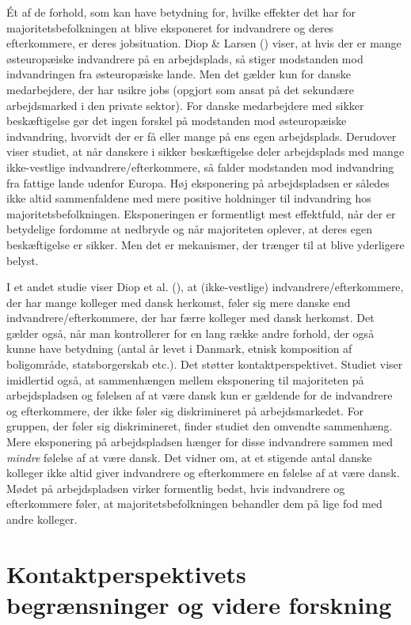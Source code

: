 \documentclass[
]{book}
\begin{document}
Ét af de forhold, som kan have betydning for, hvilke effekter det har for majoritetsbefolkningen at blive eksponeret for indvandrere og deres efterkommere, er deres jobsituation. Diop \& Larsen () viser, at hvis der er mange østeuropæiske indvandrere på en arbejdsplads, så stiger modstanden mod indvandringen fra østeuropæiske lande. Men det gælder kun for danske medarbejdere, der har usikre jobs (opgjort som ansat på det sekundære arbejdsmarked i den private sektor). For danske medarbejdere med sikker beskæftigelse gør det ingen forskel på modstanden mod østeuropæiske indvandring, hvorvidt der er få eller mange på ens egen arbejdsplads. Derudover viser studiet, at når danskere i sikker beskæftigelse deler arbejdsplads med mange ikke-vestlige indvandrere/efterkommere, så falder modstanden mod indvandring fra fattige lande udenfor Europa. Høj eksponering på arbejdspladsen er således ikke altid sammenfaldene med mere positive holdninger til indvandring hos majoritetsbefolkningen. Eksponeringen er formentligt mest effektfuld, når der er betydelige fordomme at nedbryde og når majoriteten oplever, at deres egen beskæftigelse er sikker. Men det er mekanismer, der trænger til at blive yderligere belyst.

I et andet studie viser Diop et al. (), at (ikke-vestlige) indvandrere/efterkommere, der har mange kolleger med dansk herkomst, føler sig mere danske end indvandrere/efterkommere, der har færre kolleger med dansk herkomst. Det gælder også, når man kontrollerer for en lang række andre forhold, der også kunne have betydning (antal år levet i Danmark, etnisk komposition af boligområde, statsborgerskab etc.). Det støtter kontaktperspektivet. Studiet viser imidlertid også, at sammenhængen mellem eksponering til majoriteten på arbejdspladsen og følelsen af at være dansk kun er gældende for de indvandrere og efterkommere, der ikke føler sig diskrimineret på arbejdsmarkedet. For gruppen, der føler sig diskrimineret, finder studiet den omvendte sammenhæng. Mere eksponering på arbejdspladsen hænger for disse indvandrere sammen med \emph{mindre} følelse af at være dansk. Det vidner om, at et stigende antal danske kolleger ikke altid giver indvandrere og efterkommere en følelse af at være dansk. Mødet på arbejdspladsen virker formentlig bedst, hvis indvandrere og efterkommere føler, at majoritetsbefolkningen behandler dem på lige fod med andre kolleger.

\section{Kontaktperspektivets begrænsninger og videre forskning}\label{kontaktperspektivets-begruxe6nsninger-og-videre-forskning}
\end{document}
